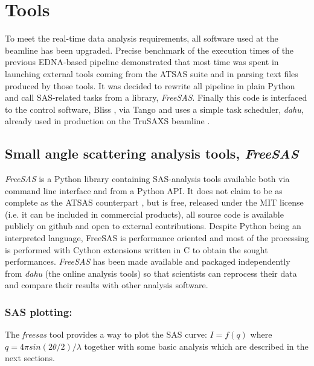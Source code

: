 \documentclass[preprint]{iucr}              %
\begin{document}
\section{Tools}

To meet the real-time data analysis requirements, all software used at the beamline has been upgraded.
Precise benchmark of the execution times of the previous EDNA-based pipeline demonstrated that 
most time was spent in launching external tools coming from the ATSAS suite and in parsing text files produced by those tools.
It was decided to rewrite all pipeline in plain Python \cite{python} and call SAS-related tasks from a library, \textit{FreeSAS}. 
Finally this code is interfaced to the control software, Bliss \cite{bliss}, via Tango \cite{tango} and uses a simple task scheduler, \textit{dahu}, already used in production on the TruSAXS beamline \cite{id02_2022}.

\subsection{Small angle scattering analysis tools, \textit{FreeSAS}}

\textit{FreeSAS} is a Python library containing SAS-analysis tools available both via command line interface and from a Python API. 
It does not claim to be as complete as the ATSAS counterpart \cite{ATSAS3},
but is free, released under the MIT license (i.e. it can be included in commercial products), all source code is available publicly on github \cite{freesas} and
open to external contributions.
Despite Python being an interpreted language, FreeSAS is performance oriented and most of the processing is performed with Cython \cite{cython} extensions written in C to obtain the sought performances. 
\textit{FreeSAS} has been made available and packaged independently from \textit{dahu} (the online analysis tools) so that scientists can reprocess their data and compare their results with other analysis software.

\subsubsection{SAS plotting:} The \textit{freesas} tool provides a way to plot the SAS curve: $I=f(q)$ where $q = 4\pi sin(2\theta/2)/\lambda$ together with some basic analysis which are described in the next sections.
\end{document}
